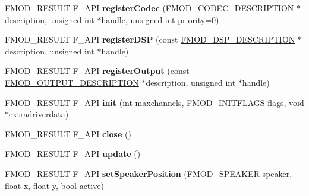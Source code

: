 \begin{DoxyCompactItemize}
\mbox{\label{classFMOD_1_1System_af2d0ac8c44aa4ac6f4ba67e6004dcad6}} 
F\+M\+O\+D\+\_\+\+R\+E\+S\+U\+LT F\+\_\+\+A\+PI {\bfseries register\+Codec} (\hyperlink{structFMOD__CODEC__DESCRIPTION}{F\+M\+O\+D\+\_\+\+C\+O\+D\+E\+C\+\_\+\+D\+E\+S\+C\+R\+I\+P\+T\+I\+ON} $\ast$description, unsigned int $\ast$handle, unsigned int priority=0)
\item 
\mbox{\label{classFMOD_1_1System_aafa782d22d2647a52acb59ff2d8b37ce}} 
F\+M\+O\+D\+\_\+\+R\+E\+S\+U\+LT F\+\_\+\+A\+PI {\bfseries register\+D\+SP} (const \hyperlink{structFMOD__DSP__DESCRIPTION}{F\+M\+O\+D\+\_\+\+D\+S\+P\+\_\+\+D\+E\+S\+C\+R\+I\+P\+T\+I\+ON} $\ast$description, unsigned int $\ast$handle)
\item 
\mbox{\label{classFMOD_1_1System_ab9b3447553fe2ac926f9d219f775f7c2}} 
F\+M\+O\+D\+\_\+\+R\+E\+S\+U\+LT F\+\_\+\+A\+PI {\bfseries register\+Output} (const \hyperlink{structFMOD__OUTPUT__DESCRIPTION}{F\+M\+O\+D\+\_\+\+O\+U\+T\+P\+U\+T\+\_\+\+D\+E\+S\+C\+R\+I\+P\+T\+I\+ON} $\ast$description, unsigned int $\ast$handle)
\item 
\mbox{\label{classFMOD_1_1System_a0f8f7c5f25875362ff9d822ca894857a}} 
F\+M\+O\+D\+\_\+\+R\+E\+S\+U\+LT F\+\_\+\+A\+PI {\bfseries init} (int maxchannels, F\+M\+O\+D\+\_\+\+I\+N\+I\+T\+F\+L\+A\+GS flags, void $\ast$extradriverdata)
\item 
\mbox{\label{classFMOD_1_1System_af8b6c4c677e44197657893de01383169}} 
F\+M\+O\+D\+\_\+\+R\+E\+S\+U\+LT F\+\_\+\+A\+PI {\bfseries close} ()
\item 
\mbox{\label{classFMOD_1_1System_a52538b2fe55918c1575ff22bbfab48d6}} 
F\+M\+O\+D\+\_\+\+R\+E\+S\+U\+LT F\+\_\+\+A\+PI {\bfseries update} ()
\item 
\mbox{\label{classFMOD_1_1System_a0e814fbdc6a5a2aa2bbfbed56b461c53}} 
F\+M\+O\+D\+\_\+\+R\+E\+S\+U\+LT F\+\_\+\+A\+PI {\bfseries set\+Speaker\+Position} (F\+M\+O\+D\+\_\+\+S\+P\+E\+A\+K\+ER speaker, float x, float y, bool active)
\item 
\mbox{\label{classFMOD_1_1System_a931be005803ddbecb510eed93df39f10}} 

\end{DoxyCompactItemize}
